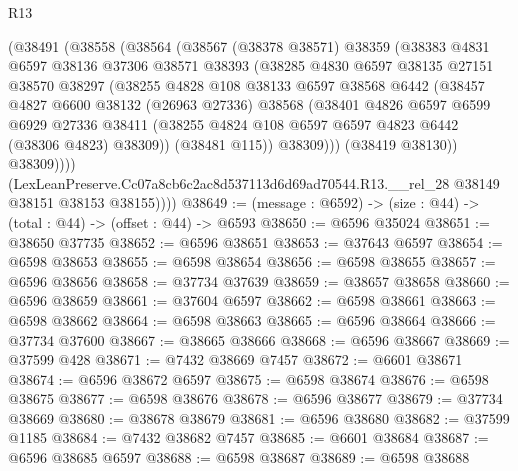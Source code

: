 \begin{lexlean}{R13}
\begin{coremodule}
            (@38491
              (@38558
                (@38564
                  (@38567
                    (@38378 @38571)
                    @38359
                    (@38383
                      @4831
                      @6597
                      @38136
                      @37306
                      @38571
                      @38393
                      (@38285
                        @4830
                        @6597
                        @38135
                        @27151
                        @38570
                        @38297
                        (@38255
                          @4828
                          @108
                          @38133
                          @6597
                          @38568
                          @6442
                          (@38457
                            @4827
                            @6600
                            @38132
                            (@26963 @27336)
                            @38568
                            (@38401
                              @4826
                              @6597
                              @6599
                              @6929
                              @27336
                              @38411
                              (@38255 @4824 @108 @6597 @6597 @4823 @6442 (@38306 @4823) @38309))
                            (@38481 @115))
                          @38309)))
                    (@38419 @38130))
                  @38309))))
          (LexLeanPreserve.Cc07a8cb6c2ac8d537113d6d69ad70544.R13.__rel_28
            @38149
            @38151
            @38153
            @38155))))
@38649 := (message : @6592) -> (size : @44) -> (total : @44) -> (offset : @44) -> @6593
@38650 := @6596 @35024
@38651 := @38650 @37735
@38652 := @6596 @38651
@38653 := @37643 @6597
@38654 := @6598 @38653
@38655 := @6598 @38654
@38656 := @6598 @38655
@38657 := @6596 @38656
@38658 := @37734 @37639
@38659 := @38657 @38658
@38660 := @6596 @38659
@38661 := @37604 @6597
@38662 := @6598 @38661
@38663 := @6598 @38662
@38664 := @6598 @38663
@38665 := @6596 @38664
@38666 := @37734 @37600
@38667 := @38665 @38666
@38668 := @6596 @38667
@38669 := @37599 @428
@38671 := @7432 @38669 @7457
@38672 := @6601 @38671
@38674 := @6596 @38672 @6597
@38675 := @6598 @38674
@38676 := @6598 @38675
@38677 := @6598 @38676
@38678 := @6596 @38677
@38679 := @37734 @38669
@38680 := @38678 @38679
@38681 := @6596 @38680
@38682 := @37599 @1185
@38684 := @7432 @38682 @7457
@38685 := @6601 @38684
@38687 := @6596 @38685 @6597
@38688 := @6598 @38687
@38689 := @6598 @38688

\end{coremodule}
\end{lexlean}
